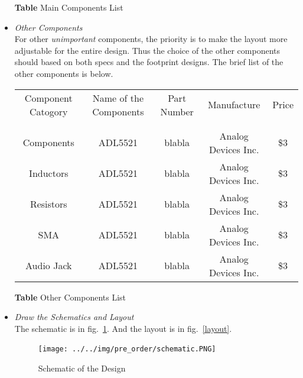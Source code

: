 \documentclass[]{article}
\begin{document}
\begin{itemize}
            \begin{center}
                \textbf{Table} Main Components List 
            \end{center}

        \item \textit{Other Components} \\
            For other \textit{unimportant} components, the priority is to make
            the layout more adjustable for the entire design. Thus the choice of
            the other components should based on both specs and the footprint
            designs. The brief list of the other components is below.

            \begin{center}
                \begin{tabular}{c c c c c}
                    Component Catogory & Name of the Components & Part Number &
                    Manufacture & Price \\ \\ \hline \\
                    Components & ADL5521 & blabla & Analog Devices Inc.
                    & \$3 \\
                    Inductors & ADL5521 & blabla & Analog Devices Inc. & \$3 \\
                    Resistors & ADL5521 & blabla & Analog Devices Inc. & \$3
                    \\
                    SMA & ADL5521 & blabla & Analog Devices Inc. & \$3 \\
                    Audio Jack & ADL5521 & blabla & Analog Devices Inc. & \$3 \\
                \end{tabular}
            \end{center}

            \begin{center}
                \textbf{Table} Other Components List 
            \end{center}

        \item \textit{Draw the Schematics and Layout} \\
            The schematic is in fig.~\ref{schematic}. And the layout is in
            fig.~\ref{layout}.
            \begin{figure}[p]
                \begin{center}
                    \texttt{[image: ../../img/pre\_order/schematic.PNG]}~
                    \label{schematic}
                    \caption{Schematic of the Design}
                \end{center}
            \end{figure}


\end{itemize}
\end{document}
